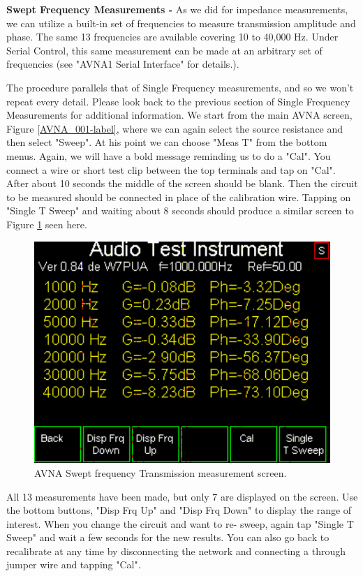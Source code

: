 \textbf{Swept Frequency Measurements - } As we did for impedance measurements, we can utilize a built-in set of frequencies to measure transmission amplitude and phase.  The same 13 frequencies are available covering 10 to 40,000 Hz.  Under Serial Control, this same measurement can be made at an arbitrary set of frequencies (see "AVNA1 Serial Interface" for details.).

The procedure parallels that of Single Frequency measurements, and so we won't repeat every detail.  Please look back to the previous section of Single Frequency Measurements  for additional information.  We start from the main AVNA screen, Figure \ref{AVNA_001-label}, where we can again select the source resistance and then select "\textsf{Sweep}".  At his point we can choose "\textsf{Meas T}" from the bottom menus.  Again, we will have a bold message reminding us to do a "\textsf{Cal}".  You connect a wire or short test clip between the top terminals and tap on "\textsf{Cal}".  After  about 10 seconds the middle of the screen should be blank. Then the circuit to be measured should be connected in place of the calibration wire.  Tapping on "\textsf{Single T Sweep}" and waiting about 8 seconds should produce a similar screen to Figure  \ref{AVNA_032-label} seen here.
\begin{figure}[H]
\begin{center}
\includegraphics[scale=0.75]{./images/AVNA_032.pdf}
\caption{AVNA Swept frequency Transmission measurement screen.}
\label{AVNA_032-label}
\end{center}
\end{figure}
%
All 13 measurements have been made, but only 7 are displayed on the screen.  Use the bottom buttons, "\textsf{Disp Frq Up}" and "\textsf{Disp Frq Down}" to display the range of interest.  When you change the circuit and want to re- sweep, again tap "\textsf{Single T Sweep}" and wait a few seconds for the new results.  You can also go back to recalibrate at any time by disconnecting the network and connecting a through jumper wire and tapping "\textsf{Cal}".

